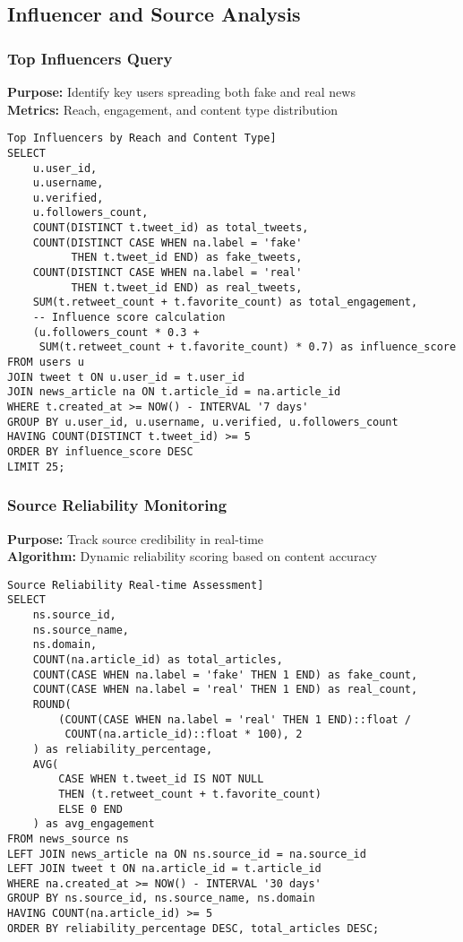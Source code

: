 \documentclass[11pt,a4paper]{article}
\begin{document}
\subsection{Influencer and Source Analysis}

\subsubsection{Top Influencers Query}
\textbf{Purpose:} Identify key users spreading both fake and real news\\
\textbf{Metrics:} Reach, engagement, and content type distribution

\begin{verbatim}Top Influencers by Reach and Content Type]
SELECT 
    u.user_id,
    u.username,
    u.verified,
    u.followers_count,
    COUNT(DISTINCT t.tweet_id) as total_tweets,
    COUNT(DISTINCT CASE WHEN na.label = 'fake' 
          THEN t.tweet_id END) as fake_tweets,
    COUNT(DISTINCT CASE WHEN na.label = 'real' 
          THEN t.tweet_id END) as real_tweets,
    SUM(t.retweet_count + t.favorite_count) as total_engagement,
    -- Influence score calculation
    (u.followers_count * 0.3 + 
     SUM(t.retweet_count + t.favorite_count) * 0.7) as influence_score
FROM users u
JOIN tweet t ON u.user_id = t.user_id
JOIN news_article na ON t.article_id = na.article_id
WHERE t.created_at >= NOW() - INTERVAL '7 days'
GROUP BY u.user_id, u.username, u.verified, u.followers_count
HAVING COUNT(DISTINCT t.tweet_id) >= 5
ORDER BY influence_score DESC
LIMIT 25;
\end{verbatim}

\subsubsection{Source Reliability Monitoring}
\textbf{Purpose:} Track source credibility in real-time\\
\textbf{Algorithm:} Dynamic reliability scoring based on content accuracy

\begin{verbatim}Source Reliability Real-time Assessment]
SELECT 
    ns.source_id,
    ns.source_name,
    ns.domain,
    COUNT(na.article_id) as total_articles,
    COUNT(CASE WHEN na.label = 'fake' THEN 1 END) as fake_count,
    COUNT(CASE WHEN na.label = 'real' THEN 1 END) as real_count,
    ROUND(
        (COUNT(CASE WHEN na.label = 'real' THEN 1 END)::float / 
         COUNT(na.article_id)::float * 100), 2
    ) as reliability_percentage,
    AVG(
        CASE WHEN t.tweet_id IS NOT NULL 
        THEN (t.retweet_count + t.favorite_count) 
        ELSE 0 END
    ) as avg_engagement
FROM news_source ns
LEFT JOIN news_article na ON ns.source_id = na.source_id
LEFT JOIN tweet t ON na.article_id = t.article_id
WHERE na.created_at >= NOW() - INTERVAL '30 days'
GROUP BY ns.source_id, ns.source_name, ns.domain
HAVING COUNT(na.article_id) >= 5
ORDER BY reliability_percentage DESC, total_articles DESC;
\end{verbatim}
\end{document}

